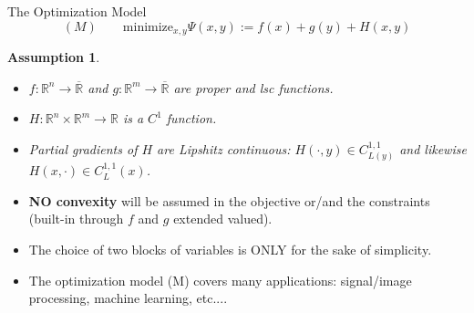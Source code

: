 \documentclass[9pt,handout]{beamer} %
\newtheorem{assumption}{Assumption}
\newcommand{\rr}{\mathbb{R}} %
\begin{document}
    \begin{frame}{The Optimization Model}
        \begin{equation*}
            (M) \qquad \mbox{minimize}_{x , y} \Psi\left(x , y\right) := f\left(x\right) + 
            g\left(y\right) + H\left(x , y\right)
        \end{equation*}
        \pause
        \vspace{-0.05in}
        \begin{assumption} \label{AssumptionsA}
            \begin{itemize}
                \item[$\rm{(i)}$] $f : \rr^{n} \rightarrow \overline{\rr}$ and $g : \rr^{m} 
                	\rightarrow \overline{\rr}$ are proper and lsc functions. %
                \item[$\rm{(ii)}$] $H : \rr^{n} \times \rr^{m} \rightarrow \rr$ is a $C^{1}$ 
                	function.
                \item[$\rm{(iii)}$] Partial gradients of $H$ are Lipshitz continuous: 
                	$H\left(\cdot , y\right) \in C^{1,1}_{L(y)}$ and likewise $H\left(x , 
                	\cdot\right) \in C^{1,1}_L(x)$.
            \end{itemize}
        \end{assumption}
        \pause
        \begin{itemize}[<+->]
            \item {\bf NO convexity} will be assumed in the objective or/and the constraints 
            	(built-in through $f$ and $g$ extended valued). \medskip
            \item The choice of two blocks of variables is ONLY for the sake of simplicity. 
            	\medskip
            \item The optimization model (M) covers many applications: signal/image 
            	processing, machine learning, etc....
        \end{itemize}
    \end{frame}
\end{document}
